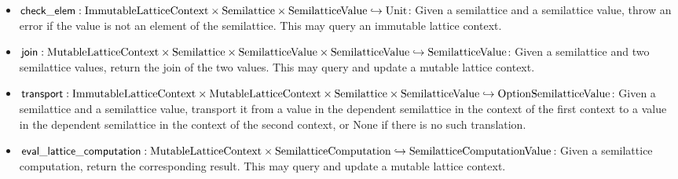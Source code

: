 \documentclass{article}
\begin{document}
      \begin{itemize}
        \item $\mathsf{check\_elem} : \mathrm{ImmutableLatticeContext} \times \mathrm{Semilattice} \times \mathrm{SemilatticeValue} \hookrightarrow \mathrm{Unit}$: Given a semilattice and a semilattice value, throw an error if the value is not an element of the semilattice. This may query an immutable lattice context.
        \item $\mathsf{join} : \mathrm{MutableLatticeContext} \times \mathrm{Semilattice} \times \mathrm{SemilatticeValue} \times \mathrm{SemilatticeValue} \hookrightarrow \mathrm{SemilatticeValue}$: Given a semilattice and two semilattice values, return the join of the two values. This may query and update a mutable lattice context.
        \item $\mathsf{transport} : \mathrm{ImmutableLatticeContext} \times \mathrm{MutableLatticeContext} \times \mathrm{Semilattice} \times \mathrm{SemilatticeValue} \hookrightarrow \mathrm{Option}{\mathrm{SemilatticeValue}}$: Given a semilattice and a semilattice value, transport it from a value in the dependent semilattice in the context of the first context to a value in the dependent semilattice in the context of the second context, or $\mathrm{None}$ if there is no such translation.
        \item $\mathsf{eval\_lattice\_computation} : \mathrm{MutableLatticeContext} \times \mathrm{SemilatticeComputation} \hookrightarrow \mathrm{SemilatticeComputationValue}$: Given a semilattice computation, return the corresponding result. This may query and update a mutable lattice context.
      \end{itemize}
\end{document}
